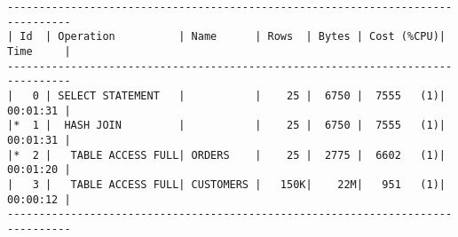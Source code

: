 \documentclass[11pt,a4paper,parskip=half]{scrartcl}
\begin{document}
\begin{lstlisting}
--------------------------------------------------------------------------------                                                                                                                                                                                                                             
| Id  | Operation          | Name      | Rows  | Bytes | Cost (%CPU)| Time     |                                                                                                                                                                                                                             
--------------------------------------------------------------------------------                                                                                                                                                                                                                             
|   0 | SELECT STATEMENT   |           |    25 |  6750 |  7555   (1)| 00:01:31 |                                                                                                                                                                                                                             
|*  1 |  HASH JOIN         |           |    25 |  6750 |  7555   (1)| 00:01:31 |                                                                                                                                                                                                                             
|*  2 |   TABLE ACCESS FULL| ORDERS    |    25 |  2775 |  6602   (1)| 00:01:20 |                                                                                                                                                                                                                             
|   3 |   TABLE ACCESS FULL| CUSTOMERS |   150K|    22M|   951   (1)| 00:00:12 |                                                                                                                                                                                                                             
--------------------------------------------------------------------------------                                                                                                                                                                                                                            
                                                                                                                                                                                                                                                                                                             

\end{lstlisting}
\end{document}
